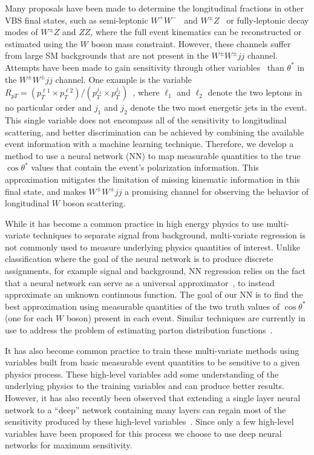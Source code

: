 \documentclass[aps,prl,twocolumn,showpacs,superscriptaddress,groupeaddress,floatfix]{revtex4}
\def\ssWW{\ensuremath{ W^{\pm}W^{\pm}jj }\xspace}
\def\ts{\ensuremath{ \theta^{*} }\xspace}
\def\cts{\ensuremath{ \cos\ts }\xspace}
\begin{document}
Many proposals have been made to determine the longitudinal fractions in other VBS final states, such as semi-leptonic
$W^+W^-$~\cite{Han:2009em} and $W^\pm Z$~\cite{VBSCuts1} or
fully-leptonic decay modes of $W^\pm Z$ and $ZZ$, where the full
event kinematics can be reconstructed or estimated using the $W$ boson mass constraint. 
However, these channels suffer from large SM backgrounds that are not present in the \ssWW channel. Attempts have been made 
to gain sensitivity through other variables~\cite{SSC_1,VBSCuts1,VBSME,Doroba:2012pd,new_VBS_warsaw_cut} than \ts in the \ssWW
channel. One example is the variable $R_{pT}=(p_{T}^{\ell 1} \times
p_{T}^{\ell 2}) / (p_T^{j_1} \times p_T^{j_2})$~\cite{Doroba:2012pd},
where $\ell_1$ and $\ell_2$ denote the two leptons in no particular
order and $j_1$ and $j_2$ denote the two most energetic jets in the
event. This single variable does not encompass all of the
sensitivity to longitudinal scattering, and better discrimination can
be achieved by combining the available event information with a
machine learning technique. Therefore, we develop a method to use a
neural network (NN) to map measurable quantities to the true \cts values
that contain the event's polarization information. This
approximation mitigates the limitation of missing kinematic information
in this final state, and makes \ssWW a promising channel for observing
the behavior of longitudinal $W$ boson scattering.
 
 
While it has become a common practice in high energy physics to use
multi-variate techniques to separate signal from background, multi-variate
regression is not commonly used to measure underlying physics quantities of interest. 
Unlike classification where the goal of the neural network is to produce
discrete assignments, for example signal and background, NN regression
relies on the fact that a neural network can serve as a universal
approximator~\cite{NN_1}, to instead approximate an unknown continuous
function.  The goal of our NN is to find the best
approximation using measurable quantities of the two truth values
of \cts (one for each $W$ boson) present in each event. Similar
techniques are currently in use to address the problem of estimating
parton distribution functions~\cite{NNPDF}.

It has also become common practice to train these multi-variate
methods using variables built from basic measurable event quantities
to be sensitive to a given physics process. These high-level variables
add some understanding of the underlying physics to the training
variables and can produce better results. However, it has also
recently been observed that extending a single layer neural network to
a ``deep'' network containing many layers can regain most of the
sensitivity produced by these high-level
variables~\cite{Baldi:2014kfa,Baldi:2014pta}. Since only a few
high-level variables have been proposed for this process we choose to
use deep neural networks for maximum sensitivity.
\end{document}
